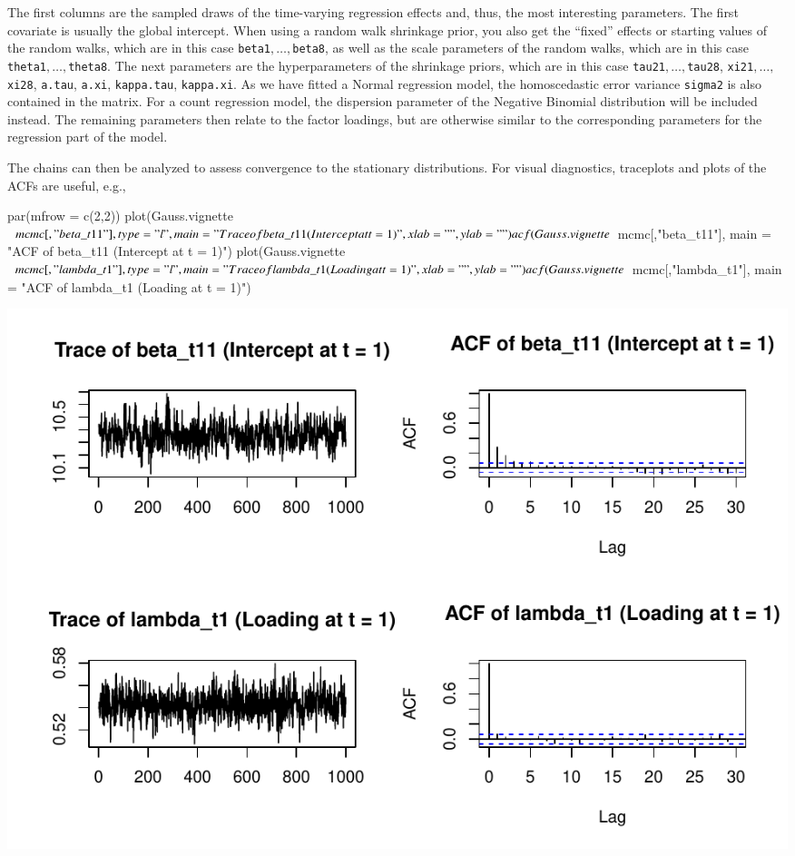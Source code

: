 \documentclass[a4paper, preprint, 3p,
authoryear]{elsarticle} %
\newenvironment{Shaded}{\begin{snugshade}}{\end{snugshade}}
\newcommand{\NormalTok}[1]{#1}
\newcommand{\pandocbounded}[1]{#1}
\begin{document}
The first columns are the sampled draws of the time-varying regression
effects and, thus, the most interesting parameters. The first covariate
is usually the global intercept. When using a random walk shrinkage
prior, you also get the ``fixed'' effects or starting values of the
random walks, which are in this case
\texttt{beta1}\(,\dots,\)\texttt{beta8}, as well as the scale parameters
of the random walks, which are in this case
\texttt{theta1}\(,\dots,\)\texttt{theta8}. The next parameters are the
hyperparameters of the shrinkage priors, which are in this case
\texttt{tau21}\(,\dots,\)\texttt{tau28},
\texttt{xi21}\(,\dots,\)\texttt{xi28}, \texttt{a.tau}, \texttt{a.xi},
\texttt{kappa.tau}, \texttt{kappa.xi}. As we have fitted a Normal
regression model, the homoscedastic error variance \texttt{sigma2} is
also contained in the matrix. For a count regression model, the
dispersion parameter of the Negative Binomial distribution will be
included instead. The remaining parameters then relate to the factor
loadings, but are otherwise similar to the corresponding parameters for
the regression part of the model.

The chains can then be analyzed to assess convergence to the stationary
distributions. For visual diagnostics, traceplots and plots of the ACFs
are useful, e.g.,

\begin{Shaded}
\begin{Highlighting}[]
\NormalTok{par(mfrow = c(2,2))}
\NormalTok{plot(Gauss.vignette$mcmc[,"beta\_t11"], type = "l", }
\NormalTok{     main = "Trace of beta\_t11 (Intercept at t = 1)", xlab = "", ylab = "")}
\NormalTok{acf(Gauss.vignette$mcmc[,"beta\_t11"],}
\NormalTok{    main = "ACF of beta\_t11 (Intercept at t = 1)")}
\NormalTok{plot(Gauss.vignette$mcmc[,"lambda\_t1"], type = "l", }
\NormalTok{     main = "Trace of lambda\_t1 (Loading at t = 1)", xlab = "", ylab = "")}
\NormalTok{acf(Gauss.vignette$mcmc[,"lambda\_t1"],}
\NormalTok{    main = "ACF of lambda\_t1 (Loading at t = 1)")}
\end{Highlighting}
\end{Shaded}

\pandocbounded{\includegraphics[keepaspectratio]{Vignette-for-panelTVP_files/figure-latex/unnamed-chunk-20-1.pdf}}
\end{document}
